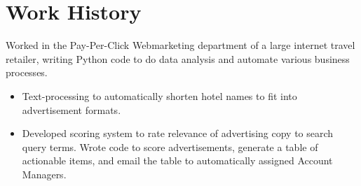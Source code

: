 \documentclass[11pt,a4paper,sans]{moderncv} %
\begin{document}


\section{Work History}


{Worked in the Pay-Per-Click Webmarketing department of a large internet travel retailer, writing Python code to do data analysis and automate various business processes.
	\begin{itemize}
		\item Text-processing to automatically shorten hotel names to fit into advertisement formats.
		\item Developed scoring system to rate relevance of advertising copy to search query terms.  Wrote code to score advertisements, generate a table of actionable items, and email the table to automatically assigned Account Managers.
	\end{itemize}
}
\vspace{0.2em}
\end{document}
